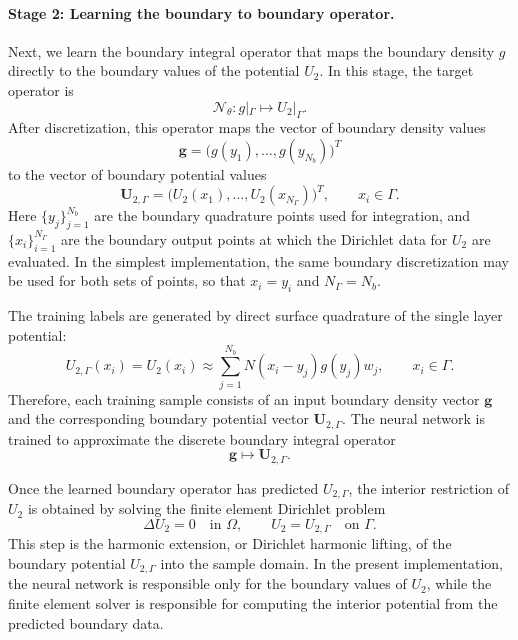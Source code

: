 \documentclass[11pt]{article}
\numberwithin{equation}{section}
\begin{document}
\paragraph{Stage 2: Learning the boundary to boundary operator.}
Next, we learn the boundary integral operator that maps the boundary density \(g\) directly to the boundary values of the potential \(U_2\). In this stage, the target operator is
\begin{equation}
    \mathcal{N}_\theta:
    g|_{\Gamma}
    \longmapsto
    U_2|_{\Gamma}.
    \label{eq:learned_boundary_to_boundary_operator}
\end{equation}
After discretization, this operator maps the vector of boundary density values
\begin{equation}
    \mathbf{g}
    =
    \bigl(g(y_1),\ldots,g(y_{N_b})\bigr)^T
\end{equation}
to the vector of boundary potential values
\begin{equation}
    \mathbf{U}_{2,\Gamma}
    =
    \bigl(U_2(x_1),\ldots,U_2(x_{N_\Gamma})\bigr)^T,
    \qquad x_i\in\Gamma.
\end{equation}
Here \(\{y_j\}_{j=1}^{N_b}\) are the boundary quadrature points used for integration, and \(\{x_i\}_{i=1}^{N_\Gamma}\) are the boundary output points at which the Dirichlet data for \(U_2\) are evaluated. In the simplest implementation, the same boundary discretization may be used for both sets of points, so that \(x_i=y_i\) and \(N_\Gamma=N_b\).

The training labels are generated by direct surface quadrature of the single layer potential:
\begin{equation}
    U_{2,\Gamma}(x_i)
    =
    U_2(x_i)
    \approx
    \sum_{j=1}^{N_b}
    N(x_i-y_j) g(y_j) w_j,
    \qquad x_i\in\Gamma.
    \label{eq:boundary_to_boundary_quadrature}
\end{equation}
Therefore, each training sample consists of an input boundary density vector \(\mathbf{g}\) and the corresponding boundary potential vector \(\mathbf{U}_{2,\Gamma}\). The neural network is trained to approximate the discrete boundary integral operator
\begin{equation}
    \mathbf{g}
    \longmapsto
    \mathbf{U}_{2,\Gamma}.
\end{equation}

Once the learned boundary operator has predicted \(U_{2,\Gamma}\), the interior restriction of \(U_2\) is obtained by solving the finite element Dirichlet problem
\begin{equation}
    \Delta U_2 = 0
    \quad \text{in } \Omega,
    \qquad
    U_2 = U_{2,\Gamma}
    \quad \text{on } \Gamma.
    \label{eq:harmonic_extension_from_boundary}
\end{equation}
This step is the harmonic extension, or Dirichlet harmonic lifting, of the boundary potential \(U_{2,\Gamma}\) into the sample domain. In the present implementation, the neural network is responsible only for the boundary values of \(U_2\), while the finite element solver is responsible for computing the interior potential from the predicted boundary data.
\end{document}
